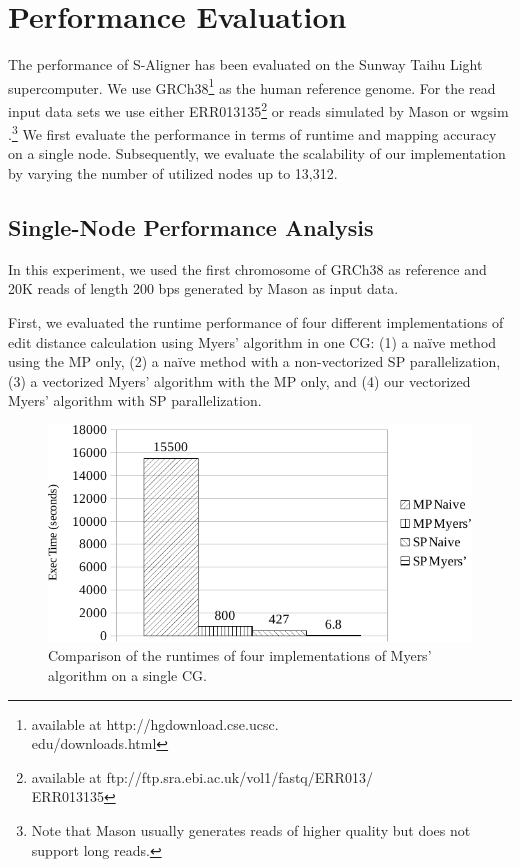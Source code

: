 \documentclass[conference]{IEEEtran}
\begin{document}
\section{Performance Evaluation}
\label{Evaluation}

The performance of S-Aligner has been evaluated on the Sunway Taihu
Light supercomputer. We use GRCh38\footnote{available at
  http://hgdownload.cse.ucsc.\\edu/downloads.html} as the human
reference genome.  For the read input data sets we use either
ERR013135\footnote{available at
  ftp://ftp.sra.ebi.ac.uk/vol1/fastq/ERR013/\\ERR013135} or reads
simulated by Mason \cite{mason} or wgsim \cite{wgsim}.\footnote{Note
  that Mason usually generates reads of higher quality but does not
  support long reads.}  We first evaluate the performance in terms of
runtime and mapping accuracy on a single node. Subsequently, we
evaluate the scalability of our implementation by varying the number
of utilized nodes up to 13,312.

\subsection{Single-Node Performance Analysis}

In this experiment, we used the first chromosome of GRCh38 as
reference and 20K reads of length 200 bps generated by Mason as input
data.

First, we evaluated the runtime performance of four different
implementations of edit distance calculation using Myers' algorithm in
one CG: (1) a na\"ive method using the MP only, (2) a na\"ive method
with a non-vectorized SP parallelization, (3) a vectorized Myers'
algorithm with the MP only, and (4) our vectorized Myers' algorithm
with SP parallelization.

\begin{figure}[!htb]
  \begin{center}
    \includegraphics[width=1\linewidth]{figures/VarVerCha}
    \caption{Comparison of the runtimes of four implementations of
      Myers' algorithm on a single CG.}
    \label{VarVerCha}
  \end{center}
\end{figure}
\end{document}
